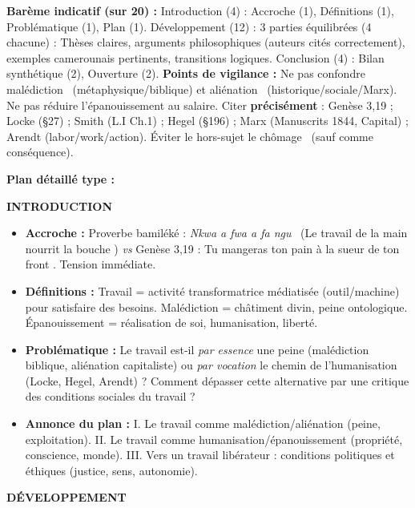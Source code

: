 \documentclass[11pt]{article}
\begin{document}
\begin{corrige}
\textbf{Barème indicatif (sur 20) :} Introduction (4) : Accroche (1), Définitions (1), Problématique (1), Plan (1). Développement (12) : 3 parties équilibrées (4 chacune) : Thèses claires, arguments philosophiques (auteurs cités correctement), exemples camerounais pertinents, transitions logiques. Conclusion (4) : Bilan synthétique (2), Ouverture (2). \textbf{Points de vigilance :} Ne pas confondre \guillemotleft malédiction \guillemotright\ (métaphysique/biblique) et \guillemotleft aliénation \guillemotright\ (historique/sociale/Marx). Ne pas réduire l'épanouissement au salaire. Citer \textbf{précisément} : Genèse 3,19 ; Locke (§27) ; Smith (L.I Ch.1) ; Hegel (§196) ; Marx (Manuscrits 1844, Capital) ; Arendt (labor/work/action). Éviter le hors-sujet \guillemotleft le chômage \guillemotright\ (sauf comme conséquence).

\textbf{Plan détaillé type :}

\textbf{INTRODUCTION}
\begin{itemize}
\item \textbf{Accroche :} Proverbe bamiléké : \guillemotleft \emph{Nkwa a fwa a fa ngu} \guillemotright\ (\guillemotleft Le travail de la main nourrit la bouche \guillemotright) \emph{vs} Genèse 3,19 : \guillemotleft Tu mangeras ton pain à la sueur de ton front \guillemotright. Tension immédiate.
\item \textbf{Définitions :} Travail = activité transformatrice médiatisée (outil/machine) pour satisfaire des besoins. Malédiction = châtiment divin, peine ontologique. Épanouissement = réalisation de soi, humanisation, liberté.
\item \textbf{Problématique :} Le travail est-il \emph{par essence} une peine (malédiction biblique, aliénation capitaliste) ou \emph{par vocation} le chemin de l'humanisation (Locke, Hegel, Arendt) ? Comment dépasser cette alternative par une critique des conditions sociales du travail ?
\item \textbf{Annonce du plan :} I. Le travail comme malédiction/aliénation (peine, exploitation). II. Le travail comme humanisation/épanouissement (propriété, conscience, monde). III. Vers un travail libérateur : conditions politiques et éthiques (justice, sens, autonomie).
\end{itemize}

\textbf{DÉVELOPPEMENT}


\end{corrige}
\end{document}
